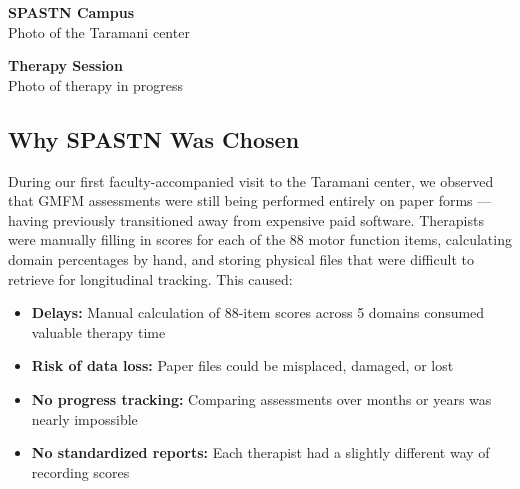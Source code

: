 \documentclass[11pt,a4paper]{article}
\begin{document}
\vspace{0.3cm}

\begin{minipage}{0.48\textwidth}
    \begin{photoplaceholder}[height=5cm]
        \vspace{1.5cm}
        {\normalsize\bfseries SPASTN Campus}\\[0.2cm]
        {\footnotesize Photo of the Taramani center}
    \end{photoplaceholder}
\end{minipage}
\hfill
\begin{minipage}{0.48\textwidth}
    \begin{photoplaceholder}[height=5cm]
        \vspace{1.5cm}
        {\normalsize\bfseries Therapy Session}\\[0.2cm]
        {\footnotesize Photo of therapy in progress}
    \end{photoplaceholder}
\end{minipage}

\vspace{0.5cm}

\subsection{Why SPASTN Was Chosen}

During our first faculty-accompanied visit to the Taramani center, we observed that GMFM assessments were still being performed entirely on paper forms --- having previously transitioned away from expensive paid software. Therapists were manually filling in scores for each of the 88 motor function items, calculating domain percentages by hand, and storing physical files that were difficult to retrieve for longitudinal tracking. This caused:

\begin{itemize}[leftmargin=2em]
    \item \textbf{Delays:} Manual calculation of 88-item scores across 5 domains consumed valuable therapy time
    \item \textbf{Risk of data loss:} Paper files could be misplaced, damaged, or lost
    \item \textbf{No progress tracking:} Comparing assessments over months or years was nearly impossible
    \item \textbf{No standardized reports:} Each therapist had a slightly different way of recording scores
\end{itemize}
\end{document}
